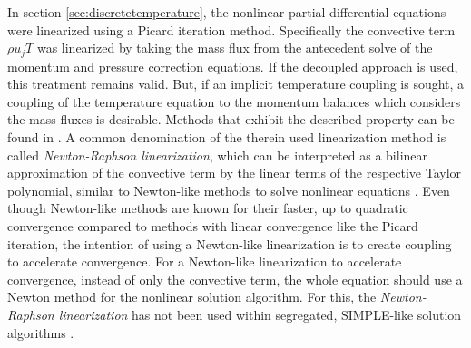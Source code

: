 In section \ref{sec:discretetemperature}, the nonlinear partial differential equations were linearized using a Picard iteration method. Specifically the convective term \(\rho u_j T\) was linearized by taking the mass flux from the antecedent solve of the momentum and pressure correction equations. If the decoupled approach is used, this treatment remains valid. But, if an implicit temperature coupling is sought, a coupling of the temperature equation to the momentum balances which considers the mass fluxes is desirable. Methods that exhibit the described property can be found in \cite{galpin86,oliveira01,sheu04,vakilipour12}. A common denomination of the therein used linearization method is called \emph{Newton-Raphson linearization}, which can be interpreted as a bilinear approximation of the convective term by the linear terms of the respective Taylor polynomial, similar to Newton-like methods to solve nonlinear equations \cite{ferziger02}. Even though Newton-like methods are known for their faster, up to quadratic convergence compared to methods with linear convergence like the Picard iteration, the intention of using a Newton-like linearization is to create coupling to accelerate convergence. For a Newton-like linearization to accelerate convergence, instead of only the convective term, the whole equation should use a Newton method for the nonlinear solution algorithm. For this, the \emph{Newton-Raphson linearization} has not been used within segregated, SIMPLE-like solution algorithms \cite{ferziger02}.

